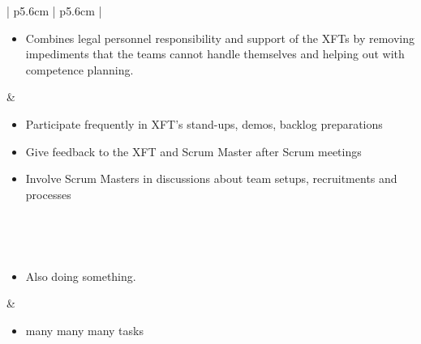 \begin{table}
\begin{tabularx}{\textwidth}{ | p{5.6cm} | p{5.6cm} | }
   \\ \hline 
   
   \begin{itemize}[label={}, leftmargin=*, topsep=0pt, itemsep=0pt, partopsep=0pt]
     \item Combines legal personnel responsibility and support of the XFTs by removing impediments that the teams cannot handle themselves and helping out with competence planning.  
   \end{itemize} & 
   
   \begin{itemize}[label={}, leftmargin=*, topsep=0pt, itemsep=0pt, partopsep=0pt]
     \item Participate frequently in XFT's stand-ups, demos, backlog preparations
     \item Give feedback to the XFT and Scrum Master after Scrum meetings
     \item Involve Scrum Masters in discussions about team setups, recruitments and processes 
   \end{itemize} 
   
   \\ \hline

   
   \\ \hline
   
   \begin{itemize}[label={}, leftmargin=*, topsep=0pt, itemsep=0pt, partopsep=0pt]
     \item Also doing something.
   \end{itemize} & 
   
   \begin{itemize}[label={}, leftmargin=*, topsep=0pt, itemsep=0pt, partopsep=0pt]
     \item many many many tasks 
   \end{itemize} 
   
   \\ \hline

  \end{tabularx}
  \caption{Roles descriptions}
\end{table}